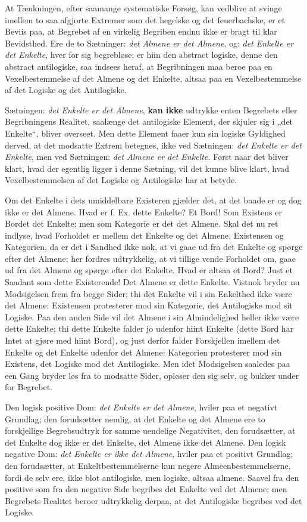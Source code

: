 \documentclass[11pt]{book}
\newcommand{\opage}[1]{\marginnote{\footnotesize\textit{[#1]}}}
\begin{document}
At Tænkningen, efter saamange systematiske Forsøg, kan vedblive at
svinge imellem to saa afgjorte Extremer som det hegelske og det
feuerbachske, er et Beviis paa, at Begrebet af en virkelig Begriben
endnu ikke er bragt til klar Bevidsthed. Ere de to Sætninger:
\emph{det Almene er det Almene}, og: \emph{det Enkelte er det
Enkelte}, hver for sig begrebløse; er hiin den abstract logiske, denne
den abstract antilogiske, saa indsees heraf, at Begribningen maa beroe
paa en Vexelbestemmelse af det Almene og det Enkelte, altsaa paa en
Vexelbestemmelse af det Logiske og det Antilogiske.

Sætningen: \emph{det Enkelte er det Almene}, \textbf{kan ikke}
udtrykke enten Begrebets eller Begribningens Realitet, saalænge det
antilogiske Element, der skjuler sig i „det Enkelte“, bliver overseet.
Men dette Element faaer kun sin logiske Gyldighed derved, at det
modsatte Extrem betegnes, ikke ved Sætningen: \emph{det Enkelte er det
Enkelte}, men ved Sætningen: \emph{det Almene er det Enkelte.} Først
naar det bliver klart, hvad der egentlig ligger i denne Sætning, vil
det kunne blive klart, hvad Vexelbestemmelsen af det Logiske og
Antilogiske har at betyde.

Om det Enkelte i dets umiddelbare Existeren gjælder det, at det baade
er og dog ikke er det Almene. Hvad er f. Ex. dette Enkelte? Et Bord!
Som Existens er Bordet det Enkelte; men som Kategorie er det det
Almene. Skal det nu ret indlyse, hvad Forholdet er mellem det Enkelte
og det Almene, Existensen og Kategorien, da er det i Sandhed ikke nok,
at vi gaae ud fra det Enkelte og spørge efter det Almene; her fordres
udtrykkelig, at vi tillige vende Forholdet om, gaae ud fra det Almene
og spørge efter det Enkelte. Hvad er altsaa et Bord? Just et Saadant
som dette Existerende! Det Almene er dette Enkelte. Vistnok bryder nu
\opage{161} \setcounter{footnote}{0}%
Modsigelsen frem fra begge Sider; thi det Enkelte vil i sin Enkelthed
ikke være det Almene: Existensen protesterer mod sin Kategorie, det
Antilogiske mod sit Logiske. Paa den anden Side vil det Almene i sin
Almindelighed heller ikke være dette Enkelte; thi dette Enkelte falder
jo udenfor hiint Enkelte (dette Bord har Intet at gjøre med hiint
Bord), og just derfor falder Forskjellen imellem det Enkelte og det
Enkelte udenfor det Almene: Kategorien protesterer mod sin Existens,
det Logiske mod det Antilogiske. Men idet Modsigelsen saaledes paa een
Gang bryder løs fra to modsatte Sider, opløser den sig selv, og bukker
under for Begrebet.

Den logisk positive Dom: \emph{det Enkelte er det Almene}, hviler paa
et negativt Grundlag; den forudsætter nemlig, at det Enkelte og det
Almene ere to forskjellige Begrebsudtryk for samme uendelige
Negativitet, den forudsætter, at det Enkelte dog ikke er det Enkelte,
det Almene ikke det Almene. Den logisk negative Dom: \emph{det Enkelte
er ikke det Almene}, hviler paa et positivt Grundlag; den forudsætter,
at Enkeltbestemmelserne kun negere Almeenbestemmelserne, fordi de selv
ere, ikke blot antilogiske, men logiske, altsaa almene. Saavel fra den
positive som fra den negative Side begribes det Enkelte ved det
Almene; men Begrebets Realitet beroer udtrykkelig derpaa, at det
Antilogiske begribes ved det Logiske.
\end{document}
